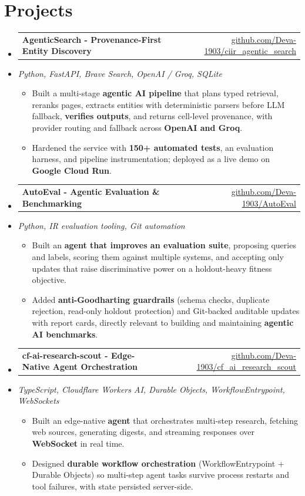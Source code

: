 \documentclass[letterpaper,10pt]{article}
\makeatletter
\newcommand{\resumeItem}[1]{
    \item\small{#1\vspace{-1pt}}
  }
\newcommand{\resumeProjectHeading}[2]{
      \item
      \begin{tabular*}{0.985\textwidth}[t]{l@{\extracolsep{\fill}}r}
        \small\textbf{#1} & \small #2 \\
      \end{tabular*}\vspace{-5pt}
  }
\newcommand{\resumeProjectSubheading}[1]{
    \vspace{-2pt}\item[] {\small\textcolor{ResumeSlate}{\emph{#1}}}\vspace{-3pt}
  }
\newcommand{\resumeSubHeadingListStart}{\begin{itemize}[leftmargin=0.0in, label={}, itemsep=2pt, topsep=2pt]}
\newcommand{\resumeSubHeadingListEnd}{\end{itemize}}
\newcommand{\resumeItemListStart}{\begin{itemize}[leftmargin=0.18in, itemsep=2pt, topsep=1pt]}
\newcommand{\resumeItemListEnd}{\end{itemize}\vspace{-4pt}}
\makeatother
\begin{document}
  \section{Projects}
  \resumeSubHeadingListStart
    \resumeProjectHeading
      {AgenticSearch - Provenance-First Entity Discovery}
      {\href{https://github.com/Deva-1903/ciir_agentic_search}{github.com/Deva-1903/ciir\_agentic\_search}}
    \resumeProjectSubheading{Python, FastAPI, Brave Search, OpenAI / Groq, SQLite}
      \resumeItemListStart
        \resumeItem{Built a multi-stage \textbf{agentic AI pipeline} that plans typed retrieval, reranks pages, extracts entities with deterministic parsers before LLM fallback, \textbf{verifies outputs}, and returns cell-level provenance, with provider routing and fallback across \textbf{OpenAI and Groq}.}
        \resumeItem{Hardened the service with \textbf{150+ automated tests}, an evaluation harness, and pipeline instrumentation; deployed as a live demo on \textbf{Google Cloud Run}.}
      \resumeItemListEnd
    \resumeProjectHeading
      {AutoEval - Agentic Evaluation \& Benchmarking}
      {\href{https://github.com/Deva-1903/AutoEval}{github.com/Deva-1903/AutoEval}}
    \resumeProjectSubheading{Python, IR evaluation tooling, Git automation}
      \resumeItemListStart
        \resumeItem{Built an \textbf{agent that improves an evaluation suite}, proposing queries and labels, scoring them against multiple systems, and accepting only updates that raise discriminative power on a holdout-heavy fitness objective.}
        \resumeItem{Added \textbf{anti-Goodharting guardrails} (schema checks, duplicate rejection, read-only holdout protection) and Git-backed auditable updates with report cards, directly relevant to building and maintaining \textbf{agentic AI benchmarks}.}
      \resumeItemListEnd
    \resumeProjectHeading
      {cf-ai-research-scout - Edge-Native Agent Orchestration}
      {\href{https://github.com/Deva-1903/cf_ai_research_scout}{github.com/Deva-1903/cf\_ai\_research\_scout}}
    \resumeProjectSubheading{TypeScript, Cloudflare Workers AI, Durable Objects, WorkflowEntrypoint, WebSockets}
      \resumeItemListStart
        \resumeItem{Built an edge-native \textbf{agent} that orchestrates multi-step research, fetching web sources, generating digests, and streaming responses over \textbf{WebSocket} in real time.}
        \resumeItem{Designed \textbf{durable workflow orchestration} (WorkflowEntrypoint + Durable Objects) so multi-step agent tasks survive process restarts and tool failures, with state persisted server-side.}
      \resumeItemListEnd
  \resumeSubHeadingListEnd
  \vspace{-4pt}
\end{document}
